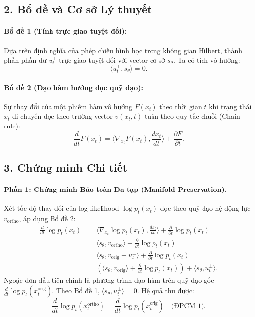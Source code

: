 \documentclass[runningheads]{llncs}
\begin{document}
\subsection*{2. Bổ đề và Cơ sở Lý thuyết}

\paragraph{Bổ đề 1 (Tính trực giao tuyệt đối):}
Dựa trên định nghĩa của phép chiếu hình học trong không gian Hilbert, thành phần phần dư $u_t^\perp$ trực giao tuyệt đối với vector cơ sở $s_\theta$. Ta có tích vô hướng:
\begin{equation}
    \langle u_t^\perp, s_\theta \rangle = 0.
\end{equation}

\paragraph{Bổ đề 2 (Đạo hàm hướng dọc quỹ đạo):}
Sự thay đổi của một phiếm hàm vô hướng $F(x_t)$ theo thời gian $t$ khi trạng thái $x_t$ di chuyển dọc theo trường vector $v(x_t, t)$ tuân theo quy tắc chuỗi (Chain rule):
\begin{equation}
    \frac{d}{dt} F(x_t) = \langle \nabla_{x_t} F(x_t), \frac{dx_t}{dt} \rangle + \frac{\partial F}{\partial t}.
\end{equation}

\subsection*{3. Chứng minh Chi tiết}

\paragraph{Phần 1: Chứng minh Bảo toàn Đa tạp (Manifold Preservation).}
Xét tốc độ thay đổi của log-likelihood $\log p_t(x_t)$ dọc theo quỹ đạo hệ động lực $v_{\text{ortho}}$, áp dụng Bổ đề 2:
\begin{align}
    \frac{d}{dt} \log p_t(x_t) &= \langle \nabla_{x_t} \log p_t(x_t), \frac{dx_t}{dt} \rangle + \frac{\partial}{\partial t} \log p_t(x_t) \\
    &= \langle s_\theta, v_{\text{ortho}} \rangle + \frac{\partial}{\partial t} \log p_t(x_t) \\
    &= \langle s_\theta, v_{\text{orig}} + u_t^\perp \rangle + \frac{\partial}{\partial t} \log p_t(x_t) \\
    &= \left( \langle s_\theta, v_{\text{orig}} \rangle + \frac{\partial}{\partial t} \log p_t(x_t) \right) + \langle s_\theta, u_t^\perp \rangle.
\end{align}
Ngoặc đơn đầu tiên chính là phương trình đạo hàm trên quỹ đạo gốc $\frac{d}{dt} \log p_t(x_t^{\text{orig}})$. 
Theo Bổ đề 1, $\langle s_\theta, u_t^\perp \rangle = 0$. Hệ quả thu được:
\begin{equation}
    \frac{d}{dt} \log p_t(x_t^{\text{ortho}}) = \frac{d}{dt} \log p_t(x_t^{\text{orig}}) \quad \text{(ĐPCM 1)}.
\end{equation}
\end{document}
